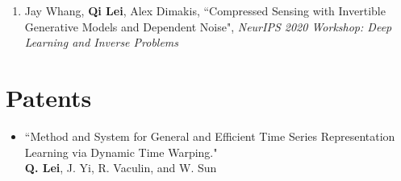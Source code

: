 \documentclass[margin, 10pt]{res} %
\begin{document}
\begin{resume}
\begin{enumerate}
\item{Jay Whang, \textbf{Qi Lei}, Alex Dimakis, 	``Compressed Sensing with Invertible Generative Models and Dependent Noise", \textit{NeurIPS 2020 Workshop: Deep Learning and Inverse Problems}
}

	
	
\end{enumerate} 






\section{Patents}\begin{itemize}
	\item{``Method and System for General and Efficient Time Series Representation 
		Learning via Dynamic Time Warping."\\
		\textbf{Q. Lei}, J. Yi, R. Vaculin, and W. Sun}
	

\end{itemize}
\end{resume}
\end{document}
